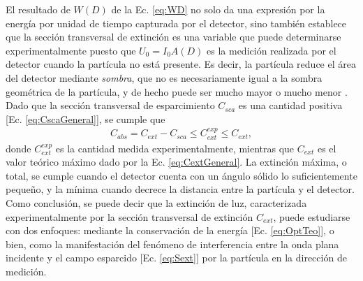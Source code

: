 El resultado de $W(D)$ de la Ec. \eqref{eq:WD} no solo da una expresión por la energía por unidad de tiempo capturada por el detector, sino también establece que la sección transversal de extinción es una variable que puede determinarse experimentalmente puesto que $U_0  = I_0A(D)$ es la medición realizada por el detector cuando la partícula no está presente. Es decir, la partícula reduce el área del detector mediante \textit{sombra}, que no es necesariamente igual a la sombra geométrica de la partícula, y de hecho puede ser mucho mayor o mucho menor \cite{bohren1998absorption}. Dado que la sección transversal de esparcimiento $C_{sca}$ es una cantidad positiva [Ec. \eqref{eq:CscaGeneral}], se cumple que
%
\begin{align}
C_{abs}  = C_{ext} - C_{sca} \leq C_{ext}^{exp} \leq C_{ext},
\end{align}
%
donde  $C_{ext}^{exp}$ es la cantidad medida experimentalmente, mientras que $C_{ext}$ es el valor teórico máximo dado por la Ec. \eqref{eq:CextGeneral}. La extinción máxima, o total, se cumple cuando el detector cuenta con un ángulo sólido lo suficientemente pequeño, y la mínima cuando decrece la distancia entre la partícula y el detector. Como conclusión, se puede decir que la extinción de luz, caracterizada experimentalmente por la sección transversal de extinción $C_{ext}$, puede estudiarse con dos enfoques: mediante la conservación de la energía [Ec. \eqref{eq:OptTeo}], o bien, como la manifestación del fenómeno de interferencia entre la onda plana incidente y el campo esparcido [Ec. \eqref{eq:Sext}]  por la partícula en la dirección de medición.

